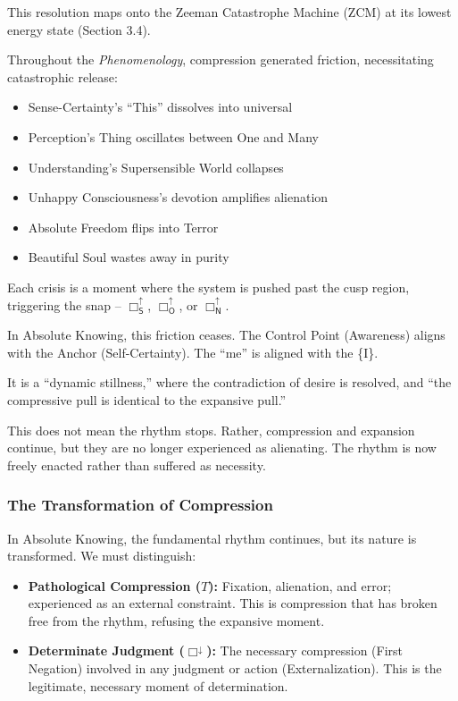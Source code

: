 \documentclass[12pt]{book}
\newcommand{\SBoxUp}{\Box_{\mathsf{S}}^{\uparrow}}
\newcommand{\OBoxUp}{\Box_{\mathsf{O}}^{\uparrow}}
\newcommand{\NBoxUp}{\Box_{\mathsf{N}}^{\uparrow}}
\begin{document}
This resolution maps onto the Zeeman Catastrophe Machine (ZCM) at its lowest energy state (Section 3.4).

Throughout the \emph{Phenomenology}, compression generated friction, necessitating catastrophic release:
\begin{itemize}
\item Sense-Certainty's ``This'' dissolves into universal
\item Perception's Thing oscillates between One and Many
\item Understanding's Supersensible World collapses
\item Unhappy Consciousness's devotion amplifies alienation
\item Absolute Freedom flips into Terror
\item Beautiful Soul wastes away in purity
\end{itemize}

Each crisis is a moment where the system is pushed past the cusp region, triggering the snap -- $\SBoxUp$, $\OBoxUp$, or $\NBoxUp$.

In Absolute Knowing, this friction ceases. The Control Point (Awareness) aligns with the Anchor (Self-Certainty). The ``me'' is aligned with the \{I\}.

It is a ``dynamic stillness,'' where the contradiction of desire is resolved, and ``the compressive pull is identical to the expansive pull.''

This does not mean the rhythm stops. Rather, compression and expansion continue, but they are no longer experienced as alienating. The rhythm is now freely enacted rather than suffered as necessity.

\subsubsection{The Transformation of Compression}

In Absolute Knowing, the fundamental rhythm continues, but its nature is transformed. We must distinguish:

\begin{itemize}
\item \textbf{Pathological Compression ($T$):} Fixation, alienation, and error; experienced as an external constraint. This is compression that has broken free from the rhythm, refusing the expansive moment.

\item \textbf{Determinate Judgment ($\Box^{\downarrow}$):} The necessary compression (First Negation) involved in any judgment or action (Externalization). This is the legitimate, necessary moment of determination.
\end{itemize}
\end{document}
